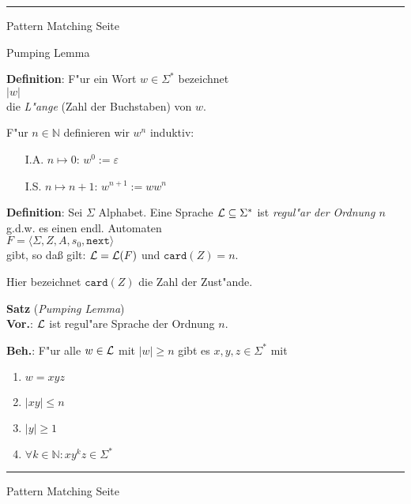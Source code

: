 \begin{slide}{}
\vspace*{\fill}
\tiny \addtocounter{mypage}{1}
\rule{17cm}{1mm}
Pattern Matching \hspace*{\fill} Seite 
\end{slide}


\begin{slide}{}
\normalsize

\begin{center}
Pumping Lemma
\end{center}
\vspace*{0.5cm}

\footnotesize
\textbf{Definition}: F"ur ein Wort $w \in \Sigma^*$ bezeichnet \\[0.3cm]
\hspace*{1.3cm} $|w|$ \\[0.3cm]
die \emph{L"ange} (Zahl der Buchstaben) von $w$.

F"ur $n \in \mathbb{N}$ definieren wir $w^n$ induktiv:
\begin{enumerate}
\item[I.A.] $n \mapsto 0$:   \hspace*{2.5cm} $w^0 := \varepsilon$
\item[I.S.] $n \mapsto n+1$: \hspace*{1.3cm} $w^{n+1} := w w^n$

\end{enumerate}

\textbf{Definition}: Sei $\Sigma$ Alphabet. Eine Sprache ${\cal L} \subseteq \Sigma^*$
ist \emph{regul"ar der Ordnung $n$} g.d.w. es einen endl. Automaten \\[0.3cm]
\hspace*{1.3cm} $F = \langle \Sigma, Z, A, s_0, \mathtt{next} \rangle$ \\[0.3cm]
gibt, so da{\ss} gilt: \quad ${\cal L} = {\cal L}(F)$ und $\mathtt{card}(Z) = n$.

Hier bezeichnet $\texttt{card}(Z)$ die Zahl der Zust"ande.

\textbf{Satz} (\textsl{Pumping Lemma}) \\[0.3cm]
\textbf{Vor.}: ${\cal L}$ ist regul"are Sprache der Ordnung $n$.

\textbf{Beh.}: F"ur alle $w \in {\cal L}$ mit $|w| \geq n$ gibt es $x,y,z \in \Sigma^*$ mit
\begin{enumerate}
\item $w = xyz$
\item $|xy| \leq n$
\item $|y| \geq 1$
\item $\forall k \in \mathbb{N}: x y^k z \in \Sigma^*$
\end{enumerate}

\vspace*{\fill}
\tiny \addtocounter{mypage}{1}
\rule{17cm}{1mm}
Pattern Matching \hspace*{\fill} Seite 
\end{slide}

